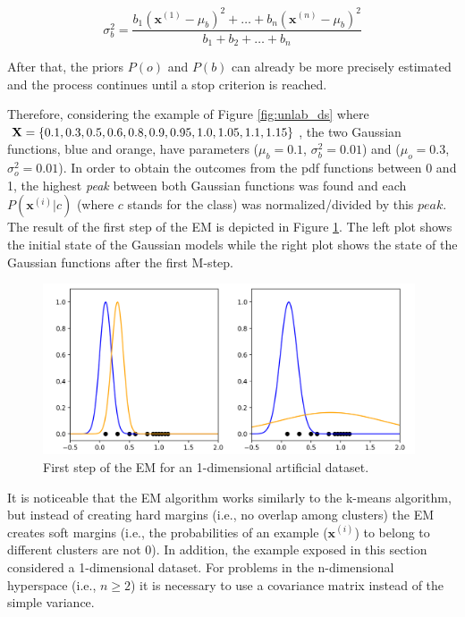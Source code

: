 \begin{equation}
    \sigma^{2}_b = \frac{b_{1}(\mathbf{x}^{(1)} - \mu_{b})^{2} + \ldots + b_{n}(\mathbf{x}^{(n)} - \mu_{b})^{2}}{b_{1} + b_{2} + \ldots + b_{n}}
\end{equation}

After that, the priors $P(o)$ and $P(b)$ can already be more precisely estimated and the process continues until a stop criterion is reached.

Therefore, considering the example of Figure \ref{fig:unlab_ds} where $\mathbf{X} = \{0.1, 0.3, 0.5,\\ 0.6, 0.8, 0.9, 0.95, 1.0, 1.05, 1.1, 1.15 \}$, the two Gaussian functions, blue and orange, have parameters ($\mu_{b} = 0.1$, $\sigma^{2}_{b} = 0.01$) and ($\mu_{o} = 0.3$, $\sigma^{2}_{o} = 0.01$). In order to obtain the outcomes from the pdf functions between 0 and 1, the highest \textit{peak} between both Gaussian functions was found and each $P(\mathbf{x}^{(i)}|c)$ (where $c$ stands for the class) was normalized/divided by this $peak$. The result of the first step of the EM is depicted in Figure \ref{fig:step1}. The left plot shows the initial state of the Gaussian models while the right plot shows the state of the Gaussian functions after the first M-step.

\begin{figure}[ht]
\centering
\includegraphics[width=11cm]{figures/step1.png}
\caption{First step of the EM for an 1-dimensional artificial dataset.}
\label{fig:step1}
\end{figure}


It is noticeable that the EM algorithm works similarly to the k-means algorithm, but instead of creating hard margins (i.e., no overlap among clusters) the EM creates soft margins (i.e., the probabilities of an example ($\mathbf{x}^{(i)}$) to belong to different clusters are not 0). In addition, the example exposed in this section considered a 1-dimensional dataset. For problems in the n-dimensional hyperspace (i.e., $n \geq 2$) it is necessary to use a covariance matrix instead of the simple variance. 



